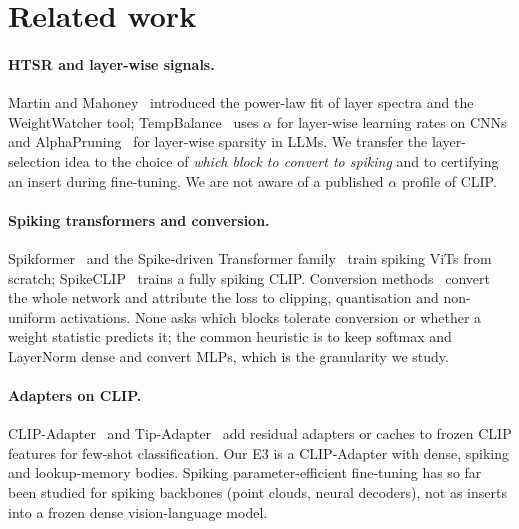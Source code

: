 \section{Related work}
\paragraph{HTSR and layer-wise signals.} Martin and Mahoney~\cite{martin2021htsr,martin2021predicting} introduced the power-law fit of layer spectra and the WeightWatcher tool; TempBalance~\cite{zhou2023tempbalance} uses $\alpha$ for layer-wise learning rates on CNNs and AlphaPruning~\cite{lu2024alphapruning} for layer-wise sparsity in LLMs. We transfer the layer-selection idea to the choice of \emph{which block to convert to spiking} and to certifying an insert during fine-tuning. We are not aware of a published $\alpha$ profile of CLIP.

\paragraph{Spiking transformers and conversion.} Spikformer~\cite{zhou2023spikformer} and the Spike-driven Transformer family~\cite{yao2023spikedriven} train spiking ViTs from scratch; SpikeCLIP~\cite{li2023spikeclip} trains a fully spiking CLIP. Conversion methods~\cite{rueckauer2017conversion,you2024spikeziptf,jiang2024sta} convert the whole network and attribute the loss to clipping, quantisation and non-uniform activations. None asks which blocks tolerate conversion or whether a weight statistic predicts it; the common heuristic is to keep softmax and LayerNorm dense and convert MLPs, which is the granularity we study.

\paragraph{Adapters on CLIP.} CLIP-Adapter~\cite{gao2021clipadapter} and Tip-Adapter~\cite{zhang2022tipadapter} add residual adapters or caches to frozen CLIP features for few-shot classification. Our E3 is a CLIP-Adapter with dense, spiking and lookup-memory bodies. Spiking parameter-efficient fine-tuning has so far been studied for spiking backbones (point clouds, neural decoders), not as inserts into a frozen dense vision-language model.
